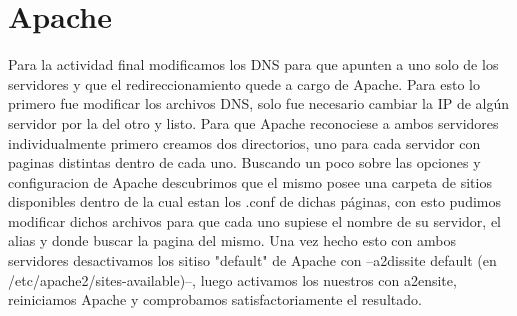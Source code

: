 \documentclass[12pt,a4paper]{article}
\begin{document}
	\section{Apache}
	Para la actividad final modificamos los DNS para que apunten a uno solo de los servidores y que el redireccionamiento quede a cargo de Apache.
	Para esto lo primero fue modificar los archivos DNS, solo fue necesario cambiar la IP de algún servidor por la del otro y listo.
	Para que Apache reconociese a ambos servidores individualmente primero creamos dos directorios, uno para cada servidor con paginas distintas dentro de cada uno.
	Buscando un poco sobre las opciones y configuracion de Apache descubrimos que el mismo posee una carpeta de sitios disponibles dentro de la cual estan los .conf de dichas páginas, con esto pudimos modificar dichos archivos para que cada uno supiese el nombre de su servidor, el alias y donde buscar la pagina del mismo.
	Una vez hecho esto con ambos servidores desactivamos los sitiso "default" de Apache con --a2dissite default (en /etc/apache2/sites-available)--, luego activamos los nuestros con a2ensite, reiniciamos Apache y comprobamos satisfactoriamente el resultado. 
\end{document}
